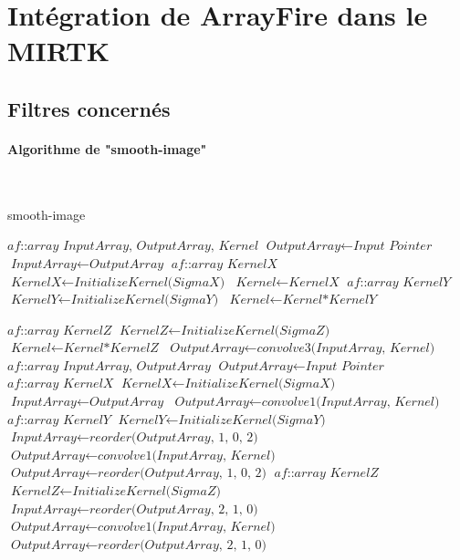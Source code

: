 \documentclass[10pt]{report}
\begin{document}
	
	
	
	\section{Intégration de ArrayFire dans le MIRTK}
	\subsection{Filtres concernés}
	\paragraph{Algorithme de "smooth-image"}
~\par

	\begin{algorithm}[H]
		\caption{smooth-image}\label{smooth-image}
		\begin{algorithmic}[1]
				\State $\textit{af::array InputArray, OutputArray, Kernel}$
				\State $\textit{OutputArray} \gets \textit{Input Pointer}$
				\State $\textit{InputArray} \gets \textit{OutputArray}$
					\State $\textit{af::array KernelX}$	
					\State $\textit{KernelX} \gets \textit{InitializeKernel(SigmaX)}$
					\State $\textit{Kernel} \gets \textit{KernelX}$
				\EndIf
					\State $\textit{af::array KernelY}$	
					\State $\textit{KernelY} \gets \textit{InitializeKernel(SigmaY)}$
					\State $\textit{Kernel} \gets \textit{Kernel*KernelY}$

				\EndIf
					\State $\textit{af::array KernelZ}$	
					\State $\textit{KernelZ} \gets \textit{InitializeKernel(SigmaZ)}$
					\State $\textit{Kernel} \gets \textit{Kernel*KernelZ}$
				\EndIf
				\State $\textit{OutputArray} \gets \textit{convolve3(InputArray, Kernel)}$
			\EndProcedure
			\State $ $
				\State $\textit{af::array InputArray, OutputArray}$
				\State $\textit{OutputArray} \gets \textit{Input Pointer}$
					\State $\textit{af::array KernelX}$	
					\State $\textit{KernelX} \gets \textit{InitializeKernel(SigmaX)}$
					\State $\textit{InputArray} \gets \textit{OutputArray}$
					\State $\textit{OutputArray} \gets \textit{convolve1(InputArray, Kernel)}$
				\EndIf
					\State $\textit{af::array KernelY}$	
					\State $\textit{KernelY} \gets \textit{InitializeKernel(SigmaY)}$
					\State $\textit{InputArray} \gets \textit{reorder(OutputArray, 1, 0, 2)}$
					\State $\textit{OutputArray} \gets \textit{convolve1(InputArray, Kernel)}$
					\State $\textit{OutputArray} \gets \textit{reorder(OutputArray, 1, 0, 2)}$
				\EndIf
					\State $\textit{af::array KernelZ}$	
					\State $\textit{KernelZ} \gets \textit{InitializeKernel(SigmaZ)}$
					\State $\textit{InputArray} \gets \textit{reorder(OutputArray, 2, 1, 0)}$
					\State $\textit{OutputArray} \gets \textit{convolve1(InputArray, Kernel)}$
					\State $\textit{OutputArray} \gets \textit{reorder(OutputArray, 2, 1, 0)}$
				\EndIf
			\EndProcedure


\end{algorithmic}
\end{algorithm}
\end{document}
